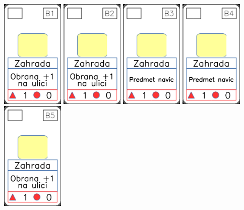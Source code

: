 \documentclass[a4paper]{article}
\begin{document}
	\includegraphics[width=3.0cm]{img-1_20}
	\includegraphics[width=3.0cm]{img-1_21}
	\includegraphics[width=3.0cm]{img-1_22}
	\includegraphics[width=3.0cm]{img-1_23}
	\includegraphics[width=3.0cm]{img-1_24}
\end{document}
